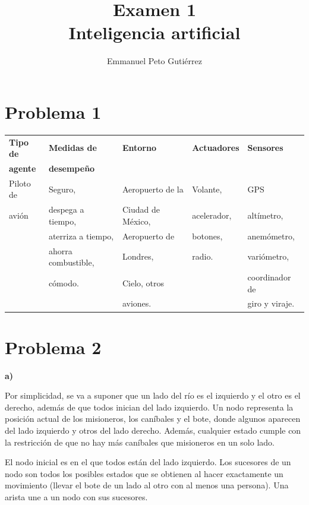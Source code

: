 \documentclass{article}
\title{Examen 1\\Inteligencia artificial}
\author{Emmanuel Peto Gutiérrez}
\begin{document}
\maketitle

\section*{Problema 1}

\begin{tabular}{|l|l|l|l|l|}
\hline
\textbf{Tipo de} & \textbf{Medidas de} & \textbf{Entorno}  & \textbf{Actuadores} &  \textbf{Sensores} \\
\textbf{agente}  & \textbf{desempeño}  &                   &            &           \\ \hline
Piloto de        &  Seguro,            & Aeropuerto de la  & Volante,   & GPS       \\
avión            & despega a tiempo,   & Ciudad de México, & acelerador,& altímetro, \\
                 & aterriza a tiempo,  & Aeropuerto de     & botones,   & anemómetro, \\
                 & ahorra combustible, & Londres,          & radio.     & variómetro, \\
                 & cómodo.             & Cielo, otros      &            & coordinador de\\
                 &                     & aviones.          &            & giro y viraje. \\
\hline
\end{tabular}

\section*{Problema 2}

\textbf{a)}

Por simplicidad, se va a suponer que un lado del río es el izquierdo y el otro es el derecho, además de que todos inician del lado izquierdo. Un nodo representa la posición actual de los misioneros, los caníbales y el bote, donde algunos aparecen del lado izquierdo y otros del lado derecho. Además, cualquier estado cumple con la restricción de que no hay más caníbales que misioneros en un solo lado.

El nodo inicial es en el que todos están del lado izquierdo. Los sucesores de un nodo son todos los posibles estados que se obtienen al hacer exactamente un movimiento (llevar el bote de un lado al otro con al menos una persona). Una arista une a un nodo con sus sucesores.
\end{document}
